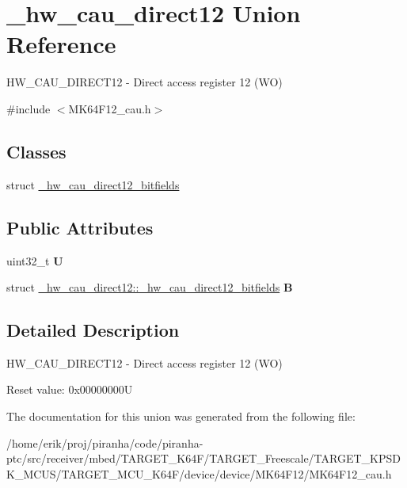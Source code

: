 \hypertarget{union__hw__cau__direct12}{}\section{\+\_\+hw\+\_\+cau\+\_\+direct12 Union Reference}
\label{union__hw__cau__direct12}


H\+W\+\_\+\+C\+A\+U\+\_\+\+D\+I\+R\+E\+C\+T12 -\/ Direct access register 12 (WO)  




{\ttfamily \#include $<$M\+K64\+F12\+\_\+cau.\+h$>$}

\subsection*{Classes}
\begin{DoxyCompactItemize}
\item 
struct \hyperlink{struct__hw__cau__direct12_1_1__hw__cau__direct12__bitfields}{\+\_\+hw\+\_\+cau\+\_\+direct12\+\_\+bitfields}
\end{DoxyCompactItemize}
\subsection*{Public Attributes}
\begin{DoxyCompactItemize}
\item 
uint32\+\_\+t {\bfseries U}\hypertarget{union__hw__cau__direct12_a452976161b9394285c0c3046d81797dc}{}\label{union__hw__cau__direct12_a452976161b9394285c0c3046d81797dc}

\item 
struct \hyperlink{struct__hw__cau__direct12_1_1__hw__cau__direct12__bitfields}{\+\_\+hw\+\_\+cau\+\_\+direct12\+::\+\_\+hw\+\_\+cau\+\_\+direct12\+\_\+bitfields} {\bfseries B}\hypertarget{union__hw__cau__direct12_a00a024cb9dc93e3d35195261a56b0b6c}{}\label{union__hw__cau__direct12_a00a024cb9dc93e3d35195261a56b0b6c}

\end{DoxyCompactItemize}


\subsection{Detailed Description}
H\+W\+\_\+\+C\+A\+U\+\_\+\+D\+I\+R\+E\+C\+T12 -\/ Direct access register 12 (WO) 

Reset value\+: 0x00000000U 

The documentation for this union was generated from the following file\+:\begin{DoxyCompactItemize}
\item 
/home/erik/proj/piranha/code/piranha-\/ptc/src/receiver/mbed/\+T\+A\+R\+G\+E\+T\+\_\+\+K64\+F/\+T\+A\+R\+G\+E\+T\+\_\+\+Freescale/\+T\+A\+R\+G\+E\+T\+\_\+\+K\+P\+S\+D\+K\+\_\+\+M\+C\+U\+S/\+T\+A\+R\+G\+E\+T\+\_\+\+M\+C\+U\+\_\+\+K64\+F/device/device/\+M\+K64\+F12/M\+K64\+F12\+\_\+cau.\+h\end{DoxyCompactItemize}

